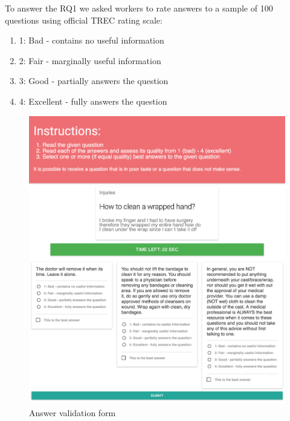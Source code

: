 \documentclass[11pt,letterpaper]{article}
\begin{document}
To answer the RQ1 we asked workers to rate answers to a sample of 100 questions using official TREC rating scale:
\begin{enumerate}
\item 1: Bad - contains no useful information
\item 2: Fair - marginally useful information
\item 3: Good - partially answers the question
\item 4: Excellent - fully answers the question
\end{enumerate}

\begin{figure}[h!]
\includegraphics[width=1.0\linewidth]{img/validation_screenshot}
\caption{Answer validation form}
\label{fig:interfaces:validation}
\end{figure}
\end{document}

